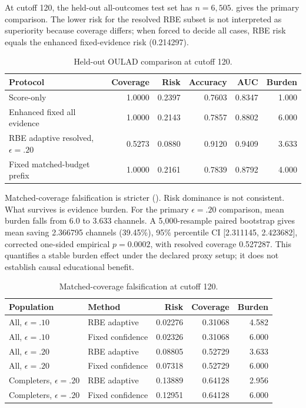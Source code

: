 \documentclass[11pt]{article}
\begin{document}
At cutoff 120, the held-out all-outcomes test set has $n=6{,}505$.  gives the primary comparison. The lower risk for the resolved RBE subset is not interpreted as superiority because coverage differs; when forced to decide all cases, RBE risk equals the enhanced fixed-evidence risk (0.214297).
\begin{table}[t]\centering
\caption{Held-out OULAD comparison at cutoff 120.}\label{tab:oulad}
\small\begin{tabular}{lrrrrr}\toprule Protocol & Coverage & Risk & Accuracy & AUC & Burden\\\midrule
Score-only & 1.0000 & 0.2397 & 0.7603 & 0.8347 & 1.000\\
Enhanced fixed all evidence & 1.0000 & 0.2143 & 0.7857 & 0.8802 & 6.000\\
RBE adaptive resolved, $\epsilon=.20$ & 0.5273 & 0.0880 & 0.9120 & 0.9409 & 3.633\\
Fixed matched-budget prefix & 1.0000 & 0.2161 & 0.7839 & 0.8792 & 4.000\\\bottomrule\end{tabular}
\end{table}

Matched-coverage falsification is stricter (). Risk dominance is not consistent. What survives is evidence burden. For the primary $\epsilon=.20$ comparison, mean burden falls from 6.0 to 3.633 channels. A 5,000-resample paired bootstrap gives mean saving 2.366795 channels (39.45\%), 95\% percentile CI [2.311145, 2.423682], corrected one-sided empirical $p=0.0002$, with resolved coverage 0.527287. This quantifies a stable burden effect under the declared proxy setup; it does not establish causal educational benefit.
\begin{table}[t]\centering
\caption{Matched-coverage falsification at cutoff 120.}\label{tab:falsification}
\small\begin{tabular}{llrrr}\toprule Population & Method & Risk & Coverage & Burden\\\midrule
All, $\epsilon=.10$ & RBE adaptive & 0.02276 & 0.31068 & 4.582\\
All, $\epsilon=.10$ & Fixed confidence & 0.02326 & 0.31068 & 6.000\\
All, $\epsilon=.20$ & RBE adaptive & 0.08805 & 0.52729 & 3.633\\
All, $\epsilon=.20$ & Fixed confidence & 0.07318 & 0.52729 & 6.000\\
Completers, $\epsilon=.20$ & RBE adaptive & 0.13889 & 0.64128 & 2.956\\
Completers, $\epsilon=.20$ & Fixed confidence & 0.12951 & 0.64128 & 6.000\\\bottomrule\end{tabular}
\end{table}
\end{document}
